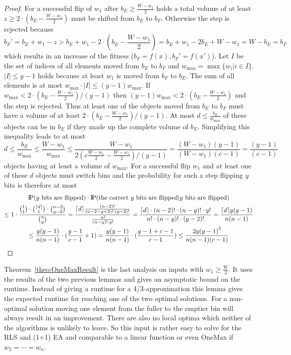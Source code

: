 \begin{proof}
    For a successful flip of $w_1$ after $b_E \ge \frac{W-w_1}{2}$ holds a total volume of at least $z\ge2\cdot(b_E-\frac{W-w_1}{2})$ must be shifted from $b_E$ to $b_F$.
    Otherwise the step is rejected because
    \[b_F'=b_E+w_1-z>b_E+w_1-2\cdot(b_E-\frac{W-w_1}{2})=b_E+w_1-2b_E+W-w_1=W-b_E=b_F\]
    which results in an increase of the fitness ($b_F = f(x), b_F' = f(x')$).
    Let $I$ be the set of indices of all elements moved from $b_E$ to $b_F$ and $w_{\max}=\max{\{w_i|i\in I\}}$.
    $|I|\le y-1$ holds because at least $w_1$ is moved from $b_F$ to $b_E$.
    The sum of all elements is at most $w_{\max} \cdot |I| \le (y-1)w_{\max}$.
    If \(w_{\max}<2\cdot(b_E-\frac{W-w_1}{2})/(y-1)\) then \((y-1)w_{\max}<2\cdot(b_E-\frac{W-w_1}{2})\) and the step is rejected.
    Thus at least one of the objects moved from $b_E$ to $b_F$ must have a volume of at least $2\cdot(b_E-\frac{W-w_1}{2})/(y-1)$.
    At most \(d\le\frac{b_E}{w_{\max}}\) of these objects can be in $b_E$ if they made up the complete volume of $b_E$. Simplifying this inequality leads to at most
    \[
        d \le \frac{b_E}{w_{\max}}
        \le \frac{W-w_1}{w_{\max}}
        \le \frac{W-w_1}{2(c\frac{W-w_1}{2}-\frac{W-w_1}{2})/(y-1)}
        = \frac{(W-w_1)(y-1)}{(W-w_1)(c-1)}
        = \frac{(y-1)}{(c-1)}
    \]
    objects having at least a volume of $w_{\max}$.
    For a successful flip $w_1$ and at least one of these $d$ objects must switch bins and the probability for such a step flipping $y$ bits is therefore at most
    \begin{gather}
        \nonumber \text{I\kern-0.15em P}(y \text{ bits are flipped})\cdot\text{I\kern-0.15em P}(\text{the correct $y$ bits are flipped} | y \text{ bits are flipped})\\ \nonumber
        \le 1\cdot \frac{\binom{1}{1}\cdot\binom{\lceil d\rceil}{1}\cdot\binom{n-2}{y-2}}{\binom{n}{y}}
        =\frac{\lceil d\rceil\frac{(n-2)!}{(n-2-y+2)!\cdot (y-2)!}}{\frac{n!}{(n-y)!\cdot y!}}
        =\frac{\lceil d\rceil\cdot(n-2)!\cdot(n-y)!\cdot y!}{n!\cdot(n-y)!\cdot(y-2)!}
        = \frac{\lceil d\rceil y{(y-1)}}{n(n-1)}\\ \nonumber
        \le \frac{y{(y-1)}}{n(n-1)}\cdot(\frac{y-1}{c-1}+1)
        = \frac{y{(y-1)}}{n(n-1)}\cdot(\frac{y-1+c-1}{c-1})
        \le \frac{2y{(y-1)}^2}{n(n-1)(c-1)}
    \end{gather}
\end{proof}

Theorem~\ref{theo:OneMaxResult} is the last analysis on inputs with $w_1 \ge \frac W 2$.
It uses the results of the two previous lemmas and gives an asymptotic bound on the runtime.
Instead of giving a runtime for a 4/3-approximation this lemma gives the expected runtime for reaching one of the two optimal solutions.
For a non-optimal solution moving one element from the fuller to the emptier bin will always result in an improvement.
There are also no local optima which neither of the algorithms is unlikely to leave.
So this input is rather easy to solve for the RLS and (1+1) EA and comparable to a linear function or even OneMax if $w_2=\cdots=w_n$.

